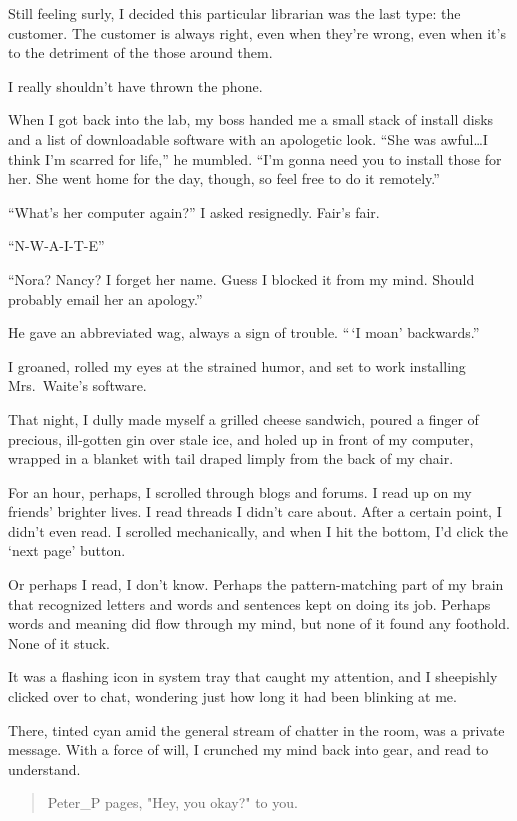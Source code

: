 Still feeling surly, I decided this particular librarian was the last type: the customer. The customer is always right, even when they're wrong, even when it's to the detriment of the those around them.

I really shouldn't have thrown the phone.

When I got back into the lab, my boss handed me a small stack of install disks and a list of downloadable software with an apologetic look. ``She was awful\ldots{}I think I'm scarred for life,'' he mumbled. ``I'm gonna need you to install those for her. She went home for the day, though, so feel free to do it remotely.''

``What's her computer again?'' I asked resignedly. Fair's fair.

``N-W-A-I-T-E''

``Nora? Nancy? I forget her name. Guess I blocked it from my mind. Should probably email her an apology.''

He gave an abbreviated wag, always a sign of trouble. ``\,`I moan' backwards.''

I groaned, rolled my eyes at the strained humor, and set to work installing Mrs.~Waite's software.

That night, I dully made myself a grilled cheese sandwich, poured a finger of precious, ill-gotten gin over stale ice, and holed up in front of my computer, wrapped in a blanket with tail draped limply from the back of my chair.

For an hour, perhaps, I scrolled through blogs and forums. I read up on my friends' brighter lives. I read threads I didn't care about. After a certain point, I didn't even read. I scrolled mechanically, and when I hit the bottom, I'd click the `next page' button.

Or perhaps I read, I don't know. Perhaps the pattern-matching part of my brain that recognized letters and words and sentences kept on doing its job. Perhaps words and meaning did flow through my mind, but none of it found any foothold. None of it stuck.

It was a flashing icon in system tray that caught my attention, and I sheepishly clicked over to chat, wondering just how long it had been blinking at me.

There, tinted cyan amid the general stream of chatter in the room, was a private message. With a force of will, I crunched my mind back into gear, and read to understand.

\begin{verse}
    {\MUCKFamily
Peter\_P pages, "Hey, you okay?" to you.}
\end{verse}

